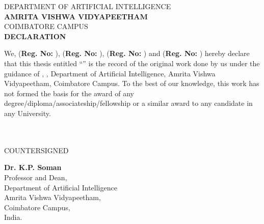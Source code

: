 	\newpage
	\begin{center}
	{\large DEPARTMENT OF ARTIFICIAL INTELLIGENCE}\\
	\Large{ \textbf{AMRITA VISHWA VIDYAPEETHAM}}\\
	{\large COIMBATORE CAMPUS}\\
		\vspace*{2.5cm}
		\large {\textbf{DECLARATION}}
		\vspace*{.3cm}
	\end{center}

	\sloppy\noindent We, \textbf{\StudentA} (\textbf{Reg. No: \RollA}), \textbf{\StudentB} (\textbf{Reg. No: \RollB}), \textbf{\StudentC} (\textbf{Reg. No: \RollC}) and \textbf{\StudentD} (\textbf{Reg. No: \RollD}) hereby declare that this thesis entitled \enquote{\textbf{\ThesisTitle}} is the record of the original work done by us under the guidance of \textbf{\AdvisorName}, \AdvisorDesignation, Department of Artificial Intelligence, Amrita Vishwa Vidyapeetham, Coimbatore Campus. To the best of our knowledge, this work has not formed the basis for the award of any degree/diploma/associateship/fellowship or a similar award to any candidate in any University.\\\\

	\vspace*{1cm}
	 \\
	\vfill
	\begin{center}
		\large{COUNTERSIGNED}\\
	\end{center}
	\vspace{0.6in}

\begin{center}
	\textbf{Dr. K.P. Soman}\\
	Professor and Dean, \\
	Department of Artificial Intelligence \\ Amrita Vishwa Vidyapeetham,\\
	Coimbatore Campus,\\
	India.
\end{center}
